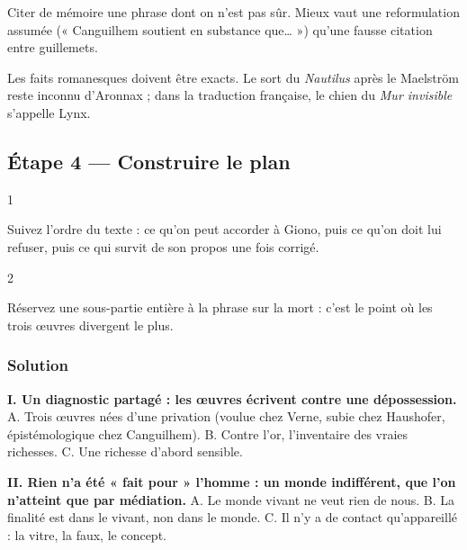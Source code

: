 \documentclass[11pt,a4paper]{article}
\begin{document}
\begin{piege}

Citer de mémoire une phrase dont on n'est pas sûr. Mieux vaut une reformulation assumée (« Canguilhem soutient en substance que\ldots{} ») qu'une fausse citation entre guillemets.

\end{piege}

\begin{piege}

Les faits romanesques doivent être exacts. Le sort du \emph{Nautilus} après le Maelström reste inconnu d'Aronnax ; dans la traduction française, le chien du \emph{Mur invisible} s'appelle Lynx.

\end{piege}

\hypertarget{uxe9tape-4-construire-le-plan}{%
\subsection{Étape 4 --- Construire le plan}\label{uxe9tape-4-construire-le-plan}}

\begin{indication}{1}

Suivez l'ordre du texte : ce qu'on peut accorder à Giono, puis ce qu'on doit lui refuser, puis ce qui survit de son propos une fois corrigé.

\end{indication}

\begin{indication}{2}

Réservez une sous-partie entière à la phrase sur la mort : c'est le point où les trois œuvres divergent le plus.

\end{indication}

\hypertarget{solution-3}{%
\subsubsection{Solution}\label{solution-3}}

\textbf{I. Un diagnostic partagé : les œuvres écrivent contre une dépossession.}
A. Trois œuvres nées d'une privation (voulue chez Verne, subie chez Haushofer, épistémologique chez Canguilhem). B. Contre l'or, l'inventaire des vraies richesses. C. Une richesse d'abord sensible.

\textbf{II. Rien n'a été « fait pour » l'homme : un monde indifférent, que l'on n'atteint que par médiation.}
A. Le monde vivant ne veut rien de nous. B. La finalité est dans le vivant, non dans le monde. C. Il n'y a de contact qu'appareillé : la vitre, la faux, le concept.
\end{document}
